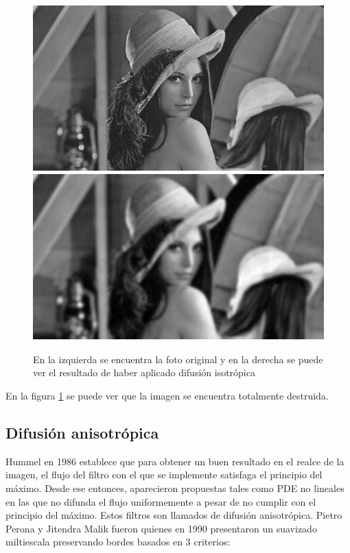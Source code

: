 \documentclass[assd_tpf_lineasinvest.tex]{subfiles}
\begin{document}
\begin{figure}[H]
\begin{centering}
\includegraphics[scale=0.5]{original.JPG}
\includegraphics[scale=0.5]{confiltro.JPG}
\par\end{centering}
\caption{En la izquierda se encuentra la foto original y en la derecha se puede ver el resultado de haber aplicado difusión isotrópica}
\label{fig:ComparacionDifIso}
\end{figure}
En la figura \ref{fig:ComparacionDifIso} se puede ver que la imagen se encuentra totalmente destruida.

\subsection{Difusión anisotrópica} 
Hummel en 1986 establece que para obtener un buen resultado en el realce de la imagen, el flujo del filtro con el que se implemente satisfaga el principio del máximo. 
Desde ese entonces, aparecieron propuestas tales como PDE no lineales en las que no difunda el flujo uniformemente a pesar de no cumplir con el principio del máximo. Estos filtros son llamados de difusión anisotrópica. 
Pietro Perona y Jitendra Malik fueron quienes en 1990 presentaron un suavizado miltiescala preservando bordes basados en 3 criterios:
\end{document}
